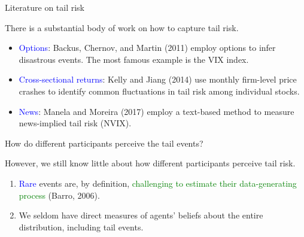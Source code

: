 \documentclass[11pt, aspectratio=169]{beamer}
\newenvironment{wideitemize}{\itemize\addtolength{\itemsep}{10pt}}{\enditemize}
\begin{document}
\begin{frame}{Literature on tail risk}
    \begin{wideitemize}
    \item There is a substantial body of work on how to capture tail risk.
    \bigskip
    \begin{itemize}
        \item \textcolor{blue}{Options}: Backus, Chernov, and Martin (2011) employ options to infer disastrous events. The most famous example is the VIX index.
    \bigskip
        \item \textcolor{blue}{Cross-sectional returns}: Kelly and Jiang (2014) use monthly firm-level price crashes to identify common fluctuations in tail risk among individual stocks.
    \bigskip
        \item \textcolor{blue}{News}: Manela and Moreira (2017) employ a text-based method to measure news-implied tail risk (NVIX).
    \end{itemize}
    \end{wideitemize}
\end{frame}

\begin{frame}{How do different participants perceive the tail events?}
    \bigskip
    \begin{wideitemize}
    \item However, \alert{we still know little about how different participants perceive tail risk.}
    \bigskip
    \begin{enumerate}
    \item \textcolor{blue}{Rare} events are, by definition, \textcolor{green}{challenging to estimate their data-generating process} (Barro, 2006).
    \bigskip  
    \item We seldom have direct measures of agents' beliefs about the entire distribution, including \alert{tail events}. 
    \end{enumerate}
    \end{wideitemize}
\end{frame}
\end{document}
